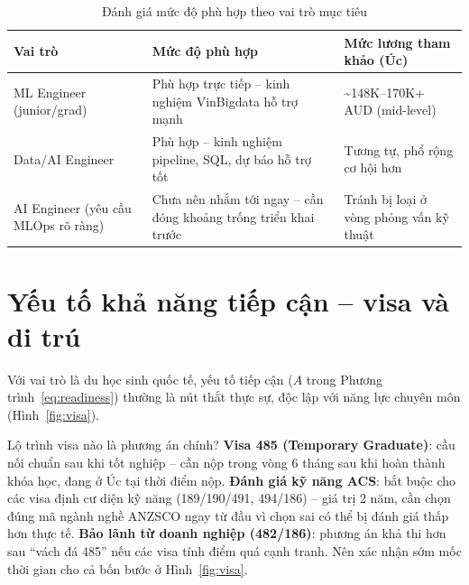 \documentclass{reportkit}
\begin{document}
\begin{table}[H]
\caption{Đánh giá mức độ phù hợp theo vai trò mục tiêu}
\label{tab:roles}
\centering
\begin{tabular}{p{3.4cm}p{5.6cm}p{3.3cm}}
\toprule
Vai trò & Mức độ phù hợp & Mức lương tham khảo (Úc) \\
\midrule
ML Engineer (junior/grad) & Phù hợp trực tiếp -- kinh nghiệm VinBigdata hỗ trợ mạnh &
  \textasciitilde148K--170K+ AUD (mid-level) \\
Data/AI Engineer & Phù hợp -- kinh nghiệm pipeline, SQL, dự báo hỗ trợ tốt & Tương tự,
  phổ rộng cơ hội hơn \\
AI Engineer (yêu cầu MLOps rõ ràng) & Chưa nên nhắm tới ngay -- cần đóng khoảng trống
  triển khai trước & Tránh bị loại ở vòng phỏng vấn kỹ thuật \\
\bottomrule
\end{tabular}
\end{table}

\section{Yếu tố khả năng tiếp cận -- visa và di trú}
Với vai trò là du học sinh quốc tế, yếu tố tiếp cận ($A$ trong Phương
trình~\ref{eq:readiness}) thường là nút thắt thực sự, độc lập với năng lực chuyên môn
(Hình~\ref{fig:visa}).

\begin{diagram}[
  type=network,
  caption={Trình tự các mốc visa cần xác nhận sớm.},
  label={fig:visa},
  source={Minh họa khái niệm; không thay thế tư vấn di trú chính thức.},
  description={Bốn mốc theo trình tự: kết thúc khóa học, nộp visa 485, đánh giá kỹ năng ACS, phương án dự phòng.}
]
\end{diagram}

\begin{decisionpoint}{Lộ trình visa nào là phương án chính?}
\textbf{Visa 485 (Temporary Graduate)}: cầu nối chuẩn sau khi tốt nghiệp -- cần nộp
trong vòng 6 tháng sau khi hoàn thành khóa học, đang ở Úc tại thời điểm nộp.
\textbf{Đánh giá kỹ năng ACS}: bắt buộc cho các visa định cư diện kỹ năng
(189/190/491, 494/186) -- giá trị 2 năm, cần chọn đúng mã ngành nghề ANZSCO ngay từ
đầu vì chọn sai có thể bị đánh giá thấp hơn thực tế. \textbf{Bảo lãnh từ doanh nghiệp
(482/186)}: phương án khả thi hơn sau ``vách đá 485'' nếu các visa tính điểm quá cạnh
tranh. Nên xác nhận sớm mốc thời gian cho cả bốn bước ở Hình~\ref{fig:visa}.
\end{decisionpoint}
\end{document}
